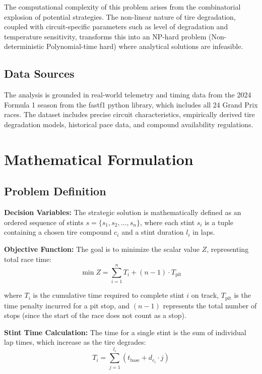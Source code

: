 \documentclass[10pt]{article}
\begin{document}
The computational complexity of this problem arises from the combinatorial explosion of potential strategies.
The non-linear nature of tire degradation, coupled with circuit-specific parameters such as level of degradation and temperature sensitivity, transforms this into an NP-hard problem (Non-deterministic Polynomial-time hard) where analytical solutions are infeasible.

\subsection{Data Sources}

The analysis is grounded in real-world telemetry and timing data from the 2024 Formula 1 season from the fastf1 python library, which includes all 24 Grand Prix races.
The dataset includes precise circuit characteristics, empirically derived tire degradation models, historical pace data, and compound availability regulations.

\section{Mathematical Formulation}

\subsection{Problem Definition}

\textbf{Decision Variables:}
The strategic solution is mathematically defined as an ordered sequence of stints $s = \{s_1, s_2, \ldots, s_n\}$, where each stint $s_i$ is a tuple containing a chosen tire compound $c_i$ and a stint duration $l_i$ in laps.

\textbf{Objective Function:}
The goal is to minimize the scalar value $Z$, representing total race time:
\begin{equation}
\min Z = \sum_{i=1}^{n} T_i + (n-1) \cdot T_{\text{pit}}
\end{equation}

where $T_i$ is the cumulative time required to complete stint $i$ on track, $T_{\text{pit}}$ is the time penalty incurred for a pit stop, and $(n-1)$ represents the total number of stops (since the start of the race does not count as a stop).

\textbf{Stint Time Calculation:}
The time for a single stint is the sum of individual lap times, which increase as the tire degrades:
\begin{equation}
T_i = \sum_{j=1}^{l_i} \left( t_{\text{base}} + d_{c_i} \cdot j \right)
\end{equation}
\end{document}
